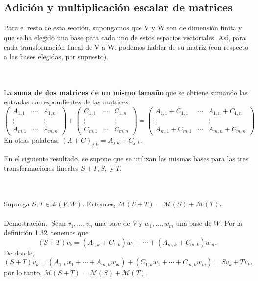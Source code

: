 \subsection*{Adición y multiplicación escalar de matrices}

Para el resto de esta sección, supongamos que V y W son de dimensión finita y que se ha elegido una base para cada uno de estos espacios vectoriales. Así, para cada transformación lineal de V a W, podemos hablar de su matriz (con respecto a las bases elegidas, por supuesto).

\setcounter{mydef}{34}
\begin{mydef}\;\\\\
    La \textbf{suma de dos matrices de un mismo tamaño} que se obtiene sumando las entradas correspondientes de las matrices:
    $$
    \begin{pmatrix}
	A_{1,1}&\cdots&A_{1,n}\\
	\vdots&&\vdots\\
	A_{m,1}&\cdots&A_{m,n}
    \end{pmatrix}
    +
    \begin{pmatrix}
	C_{1,1}&\cdots&C_{1,n}\\
	\vdots&&\vdots\\
	C_{m,1}&\cdots&C_{m,n}
    \end{pmatrix}
    =
    \begin{pmatrix}
	A_{1,1}+C_{1,1}&\cdots&A_{1,n}+C_{1,n}\\
	\vdots&&\vdots\\
	A_{m,1}+C_{m,1}&\cdots&A_{m,n}+C_{m,n}
    \end{pmatrix}
    $$
    En otras palabras, $(A+C)_{j,k}=A_{j,k}+C_{j,k}$.
\end{mydef}

En el siguiente resultado, se supone que se utilizan las mismas bases para las tres transformaciones lineales $S + T, S ,$ y $T$.

\begin{myteo}\;\\\\
    Suponga $S,T\in \mathcal{L}(V,W)$. Entonces, $\mathcal{M}(S+T)=\mathcal{M}(S)+\mathcal{M}(T)$.\\\\
	Demostración.-\; Sean $v_1,\ldots, v_n$ una base de $V$ y $w_1,\ldots,w_m$ una base de $W$. Por la definición 1.32, tenemos que
	$$(S+T)v_k=\left(A_{1,k}+C_{1,k}\right)w_1+\cdots +\left(A_{m,k}+C_{m,k}\right)w_m.$$
	De donde,
	$$(S+T)v_k=\left(A_{1,k}w_1+\cdots +A_{m,k}w_m\right)+\left(C_{1,k}w_1+\cdots +C_{m,k}w_m\right)=Sv_k + Tv_k.$$
	por lo tanto, $\mathcal{M}(S+T)=\mathcal{M}(S)+\mathcal{M}(T)$.
\end{myteo}

